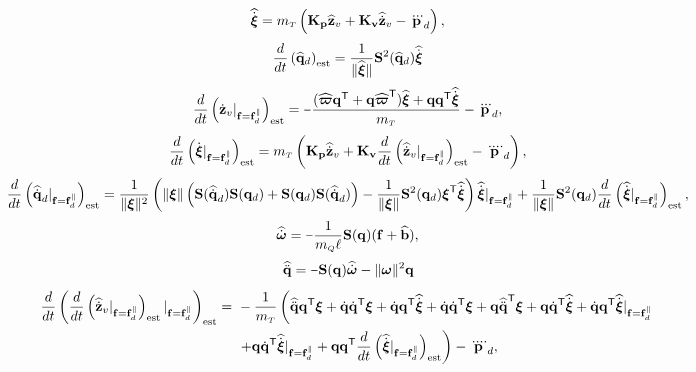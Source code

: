 \documentclass[journal,onecolumn]{IEEEtran}
\newcommand{\minus}{\scalebox{0.75}[1.0]{$-$}}
\begin{document}
	\begin{equation}
		\widehat{\dot{\Xiq}} = \mT\LP{\bf K_p} \zvhat +  {\bf K_v} \zvdothat - \pLdtdot\RP,
	\end{equation}
	\begin{equation}
		\frac{d}{dt}\LP\qdhat\RP_{\text{est}} = \frac{1}{\|\widehat{\Xiq}\|}\Skew[2]{\qdhat}\widehat{\dot{\Xiq}}
	\end{equation}
	\begin{equation}
		\frac{d}{dt}\LP\zvdot|_{\f=\fd^{\|}}\RP_{\text{est}} = \minus\frac{(\widehat{\bs{\varpi}}\dir[T] + \dir\widehat{\bs{\varpi}}\trs)\widehat{\Xiq} + \dir\dir[T]\widehat{\dot{\Xiq}}}{\mT} - \pLdtdot,
	\end{equation}
	\begin{equation}
		\frac{d}{dt}\LP\dot{\Xiq}|_{\f=\fd^{\|}}\RP_{\text{est}} = \mT\left( {\bf K_p} \zvdothat
		+ {\bf K_v} \frac{d}{dt}\LP\zvdothatdot|_{\f=\fd^{\|}}\RP_{\text{est}}
		- \pLdqdot\right),
	\end{equation}
	\begin{equation}
		\frac{d}{dt}\LP\qddothat|_{\f=\f_d^{\|}}\RP_{\text{est}} = \frac{1}{\|\Xiq\|^2}\LP\|\Xiq\|\LP\Skew{\qddothat}\Skew{\dird}+\Skew{\dird}\Skew{\qddothat}\RP-\frac{1}{\|\Xiq\|}\Skew[2]{\dird}\Xiq[T]\widehat{\dot{\Xiq}}\RP\widehat{\dot{\Xiq}}|_{\f=\fd^{\|}}+\frac{1}{\|\Xiq\|}\Skew[2]{\dird}\frac{d}{dt}\LP\widehat{\dot{\Xiq}}|_{\f=\fd^{\|}}\RP_{\text{est}},
	\end{equation}
	\begin{equation}
		\wLdothat = \minus\frac{1}{\mQ\ell}\Skew{\dir}(\f+\widehat{\dist}),
	\end{equation}
	\begin{equation}
		\dirddothat = \minus\Skew{\dir}\wLdothat - \|\wL\|^2\dir
	\end{equation}
	\begin{equation}
		\begin{aligned}
			\frac{d}{dt}\LP\frac{d}{dt}\LP\zvdothatdot|_{\f=\fd^{\|}}\RP_{\text{est}}|_{\f=\fd^{\|}}\RP_{\text{est}} =~& -\frac{1}{\mT}\left(\vphantom{\frac{d}{dt}\LP\widehat{\dot{\Xiq}}|_{\f=\fd^{\|}}\RP_{\text{est}}}\dirddothat\dir[T]\Xiq+\dirdot\dirdot[T]\Xiq+\dirdot\dir[T]\widehat{\dot{\Xiq}}+\dirdot\dirdot[T]\Xiq+\dir\dirddothat[T]\Xiq+\dir\dirdot[T]\widehat{\dot{\Xiq}}+\dirdot\dir[T]\widehat{\dot{\Xiq}}|_{\f=\fd^{\|}}\right.\nonumber\\
			&\left.+\dir\dirdot[T]\widehat{\dot{\Xiq}}|_{\f=\fd^{\|}}+\dir\dir[T]\frac{d}{dt}\LP\widehat{\dot{\Xiq}}|_{\f=\fd^{\|}}\RP_{\text{est}}\right)-\pLdqdot,
		\end{aligned}
	\end{equation}
\end{document}
